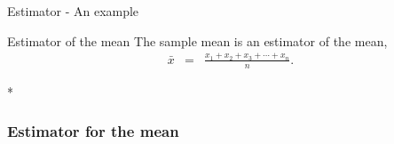 \begin{frame}{Estimator - An example}

  \begin{definition}{Estimator of the mean}
    The sample mean is an estimator of the mean,
  \begin{eqnarray*}
    \bar{x} & = & \frac{x_1 + x_2 + x_3 + \cdots + x_{n}}{n}.
  \end{eqnarray*}    
  \end{definition}
  
  \vfill
  \vfill
  \vfill

  *
\end{frame}



\begin{frame}
  \frametitle{Estimator for the mean}



\end{frame}



